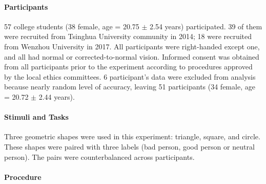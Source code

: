 \documentclass[
  english,
  man]{apa6}
\let\oldparagraph\paragraph
\renewcommand{\paragraph}[1]{\oldparagraph{#1}\mbox{}}
\begin{document}
\hypertarget{participants}{%
\paragraph{Participants}\label{participants}}

57 college students (38 female, age = 20.75 \(\pm\) 2.54 years) participated. 39 of them were recruited from Tsinghua University community in 2014; 18 were recruited from Wenzhou University in 2017. All participants were right-handed except one, and all had normal or corrected-to-normal vision. Informed consent was obtained from all participants prior to the experiment according to procedures approved by the local ethics committees. 6 participant's data were excluded from analysis because nearly random level of accuracy, leaving 51 participants (34 female, age = 20.72 \(\pm\) 2.44 years).

\hypertarget{stimuli-and-tasks}{%
\paragraph{Stimuli and Tasks}\label{stimuli-and-tasks}}

Three geometric shapes were used in this experiment: triangle, square, and circle. These shapes were paired with three labels (bad person, good person or neutral person). The pairs were counterbalanced across participants.

\hypertarget{procedure}{%
\paragraph{Procedure}\label{procedure}}
\end{document}
